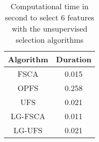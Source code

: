 \begin{table}
	\begin{center}
		\begin{tabular}{c c}
			Algorithm & Duration \\
			\hline
			FSCA & 0.015 \\
			OPFS & 0.258 \\
			UFS & 0.021 \\
			LG-FSCA & 0.011 \\
			LG-UFS & 0.021 \\
		\end{tabular}
	\end{center}
	\caption{Computational time in second to select 6 features with the unsupervised selection algorithms}
\end{table}